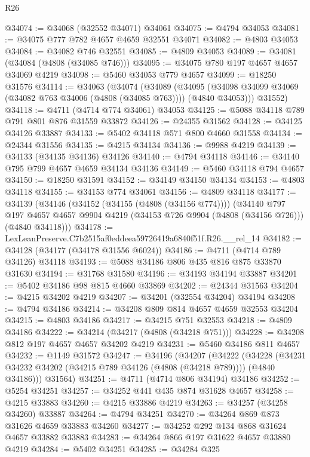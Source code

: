 \begin{lexlean}{R26}
\begin{coremodule}
@34074 := @34068 (@32552 @34071) @34061
@34075 := @4794 @34053
@34081 := @34075 @777 @782 @4657 @4659 @32551 @34071
@34082 := @4803 @34053
@34084 := @34082 @746 @32551
@34085 := @4809 @34053
@34089 := @34081 (@34084 (@4808 (@34085 @746)))
@34095 := @34075 @780 @197 @4657 @4657 @34069 @4219
@34098 := @5460 @34053 @779 @4657
@34099 := @18250 @31576
@34114 := @34063
    (@34074
      (@34089
        (@34095 (@34098 @34099 @34069 (@34082 @763 @34006 (@4808 (@34085 @763)))) (@4840 @34053)))
      @31552)
@34118 := @4711 (@4714 @774 @34061) @34053
@34125 := @5088 @34118 @789 @791 @801 @876 @31559 @33872
@34126 := @24355 @31562
@34128 := @34125 @34126 @33887
@34133 := @5402 @34118 @571 @800 @4660 @31558
@34134 := @24344 @31556
@34135 := @4215 @34134
@34136 := @9988 @4219
@34139 := @34133 (@34135 @34136) @34126
@34140 := @4794 @34118
@34146 := @34140 @795 @799 @4657 @4659 @34134 @34136
@34149 := @5460 @34118 @794 @4657
@34150 := @18250 @31591
@34152 := @34149 @34150 @34134
@34153 := @4803 @34118
@34155 := @34153 @774 @34061
@34156 := @4809 @34118
@34177 := @34139
    (@34146
      (@34152 (@34155 (@4808 (@34156 @774))))
      (@34140
        @797
        @197
        @4657
        @4657
        @9904
        @4219
        (@34153 @726 @9904 (@4808 (@34156 @726)))
        (@4840 @34118)))
@34178 := LexLeanPreserve.C7b2515af0eddeea59726419a6840f51f.R26.__rel_14
@34182 := @34128 (@34177 (@34178 @31556 @6024))
@34186 := @4711 (@4714 @789 @34126) @34118
@34193 := @5088 @34186 @806 @435 @816 @875 @33870 @31630
@34194 := @31768 @31580
@34196 := @34193 @34194 @33887
@34201 := @5402 @34186 @98 @815 @4660 @33869
@34202 := @24344 @31563
@34204 := @4215 @34202 @4219
@34207 := @34201 (@32554 @34204) @34194
@34208 := @4794 @34186
@34214 := @34208 @809 @814 @4657 @4659 @32553 @34204
@34215 := @4803 @34186
@34217 := @34215 @751 @32553
@34218 := @4809 @34186
@34222 := @34214 (@34217 (@4808 (@34218 @751)))
@34228 := @34208 @812 @197 @4657 @4657 @34202 @4219
@34231 := @5460 @34186 @811 @4657
@34232 := @1149 @31572
@34247 := @34196
    (@34207
      (@34222
        (@34228 (@34231 @34232 @34202 (@34215 @789 @34126 (@4808 (@34218 @789)))) (@4840 @34186)))
      @31564)
@34251 := @4711 (@4714 @806 @34194) @34186
@34252 := @5254 @34251
@34257 := @34252 @441 @435 @874 @31628 @4657
@34258 := @4215 @33883
@34260 := @4215 @33886 @4219
@34263 := @34257 (@34258 @34260) @33887
@34264 := @4794 @34251
@34270 := @34264 @869 @873 @31626 @4659 @33883 @34260
@34277 := @34252 @292 @134 @868 @31624 @4657 @33882 @33883
@34283 := @34264 @866 @197 @31622 @4657 @33880 @4219
@34284 := @5402 @34251
@34285 := @34284 @325

\end{coremodule}
\end{lexlean}
